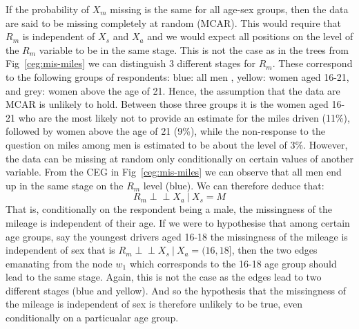 \documentclass[runningheads]{llncs}
\newcommand{\ind}{\perp\!\!\!\!\perp}
\begin{document}
If the probability of $X_m$ missing is the same for all age-sex groups, then the data are said to be missing completely at random (MCAR). This would require that $R_m$ is independent of $X_s$ and $X_a$ and we would expect all positions on the level of the $R_m$ variable to be in the same stage. 
This is not the case as in the trees from Fig~\ref{ceg:mis-miles} we can distinguish 3 different 
stages for $R_m$. These correspond to the following groups of respondents: 
blue: all men , yellow: women aged 16-21, and grey: women above the age of 21.
Hence, the assumption that the data are MCAR is unlikely to hold. Between those three groups it is the women aged 16-21 who are the most likely not to provide an estimate for the miles driven (11\%), followed by women above the age of 21 (9\%), while the non-response to the question on miles among men is estimated to be about the level of 3\%. However, the data can be missing at random only conditionally on certain values of another variable. 
From the CEG in Fig~\ref{ceg:mis-miles} we can observe that all men end up in the same stage on the $R_m$ level (blue). We can therefore deduce that:
\[R_m \ind X_a \ | \ X_s = M\]
That is, conditionally on the respondent being a male, the missingness of the mileage is independent of their age. If we were to hypothesise that among certain age groups, say the youngest drivers aged 16-18 the missingness of the mileage is independent of sex that is $R_m \ind  X_s \ | \ X_a = (16,18]$, then the two edges emanating from the node $w_1$ which corresponds to the 16-18 age group should lead to the same stage. Again, this is not the case as the edges lead to two different stages (blue and yellow). And so the hypothesis that the missingness of the mileage is independent of sex is therefore unlikely to be true, even conditionally on a particualar age group.
\end{document}

